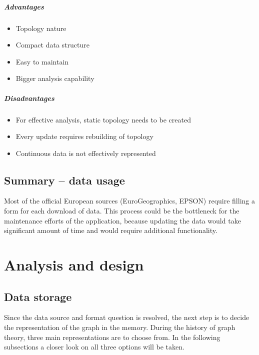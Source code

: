 \documentclass[thesis=M,english]{FITthesis}[2012/10/20]
\begin{document}
\paragraph*{Advantages}
\begin{itemize}[noitemsep]
\item Topology nature
\item Compact data structure
\item Easy to maintain
\item Bigger analysis capability
\end{itemize}

\paragraph*{Disadvantages}
\begin{itemize}[noitemsep]
\item For effective analysis, static topology needs to be created
\item Every update requires rebuilding of topology
\item Continuous data is not effectively represented
\end{itemize}

\section{Summary -- data usage}
Most of the official European sources (EuroGeographics, EPSON) require filling a form for each download of data. This process could be the bottleneck for the maintenance efforts of the application, because updating the data would take significant amount of time and would require additional functionality. 


\chapter{Analysis and design}

\section{Data storage}
Since the data source and format question is resolved, the next step is to decide the representation of the graph in the memory. During the history of graph theory, three main representations are to choose from. In the following subsections a closer look on all three options will be taken.
\end{document}
